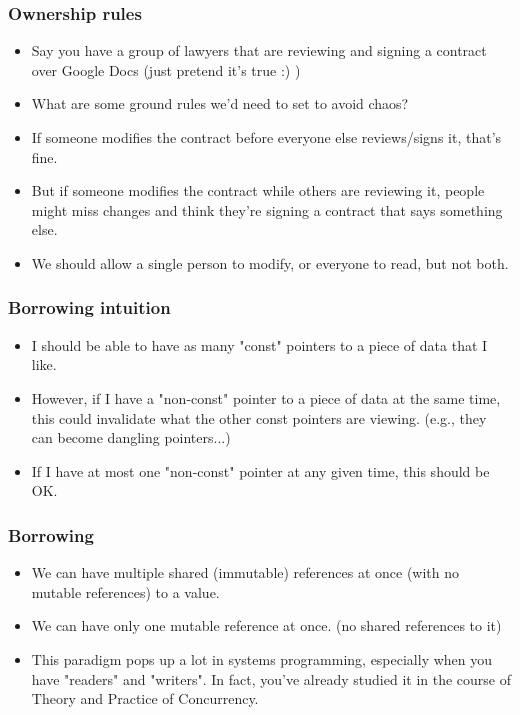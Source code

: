 \documentclass[aspectratio=1610,t]{beamer}
\begin{document}

\begin{frame}[fragile]
\frametitle{Ownership rules}
\begin{itemize}
    \item Say you have a group of lawyers that are reviewing and signing a contract over Google Docs (just pretend it's true :) )
    \item What are some ground rules we'd need to set to avoid chaos?
    \item If someone modifies the contract before everyone else reviews/signs it, that's fine.
    \item But if someone modifies the contract while others are reviewing it, people might miss changes and think they're signing a contract that says something else.
    \item We should allow a single person to modify, or everyone to read, but not both.
\end{itemize}
\end{frame}


\begin{frame}[fragile]
\frametitle{Borrowing intuition}
\begin{itemize}
    \item I should be able to have as many "const" pointers to a piece of data that I like.
    \item However, if I have a "non-const" pointer to a piece of data at the same time, this could invalidate what the other const pointers are viewing. (e.g., they can become dangling pointers...)
    \item If I have at most one "non-const" pointer at any given time, this should be OK.
\end{itemize}
\end{frame}


\begin{frame}[fragile]
\frametitle{Borrowing}
\begin{itemize}
    \item We can have multiple shared (immutable) references at once (with no mutable references) to a value.
    \item We can have only one mutable reference at once. (no shared references to it)
    \item This paradigm pops up a lot in systems programming, especially when you have "readers" and "writers". In fact, you've already studied it in the course of Theory and Practice of Concurrency.
\end{itemize}
\end{frame}
\end{document}
